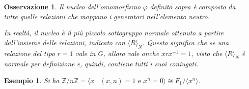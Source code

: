 \documentclass[12pt]{scrartcl}
\theoremstyle{style}
\newtheorem{esempio}{Esempio}[section]
\newtheorem{osservazione}{Osservazione}[section]
\numberwithin{equation}{subsection}
\begin{document}
\begin{osservazione}
Il nucleo dell'omomorfismo $\varphi $ definito sopra \`e composto da tutte quelle relazioni che mappano i generatori nell'elemento neutro.

In realt\`a, il nucleo \`e il pi\`u piccolo sottogruppo normale ottenuto a partire dall'insieme delle relazioni, indicato con $\langle R \rangle_N$.
Questo significa che se una relazione del tipo $r = 1$ vale in $G$, allora vale anche $xrx^{-1}=1$, visto che $\langle R \rangle_N$ \`e normale per definizione e, quindi, contiene tutti i suoi coniugati.
\end{osservazione}
\begin{esempio}
Si ha $\mathbb{Z} / n\mathbb{Z} = \langle x  \mid (x,n) = 1 \text{ e } x^n = 0 \rangle\cong F_1 / \langle x^n \rangle$.
\end{esempio}
\end{document}
